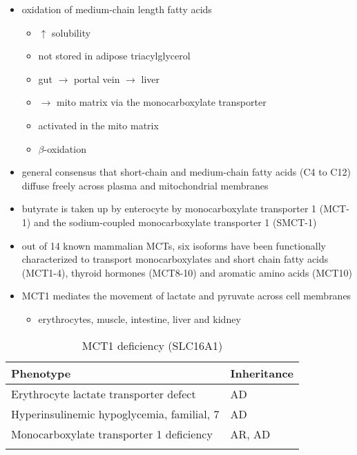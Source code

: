 \documentclass{scrartcl}
\begin{document}
\begin{itemize}
\item oxidation of medium-chain length fatty acids
\begin{itemize}
\item \(\uparrow\) solubility
\item not stored in adipose triacylglycerol
\item gut \(\to\) portal vein \(\to\) liver
\item \(\to\) mito matrix via the monocarboxylate transporter
\item activated in the mito matrix
\item \(\beta\)-oxidation
\end{itemize}

\item general consensus that short-chain and medium-chain fatty acids (C4
to C12) diffuse freely across plasma and mitochondrial membranes
\item butyrate is taken up by enterocyte by monocarboxylate transporter 1
(MCT-1) and the sodium-coupled monocarboxylate transporter 1
(SMCT-1)

\item out of 14 known mammalian MCTs, six isoforms have been functionally
characterized to transport monocarboxylates and short chain fatty
acids (MCT1-4), thyroid hormones (MCT8-10) and aromatic amino
acids (MCT10)

\item MCT1 mediates the movement of lactate and pyruvate across cell
membranes
\begin{itemize}
\item erythrocytes, muscle, intestine, liver and kidney
\end{itemize}
\end{itemize}

\begin{table}[htbp]
\caption[Monocarboxylate Transporter 1]{\label{tab:org284949a}
MCT1 deficiency (SLC16A1)}
\centering
\begin{tabular}{ll}
Phenotype & Inheritance\\
\hline
Erythrocyte lactate transporter defect & AD\\
Hyperinsulinemic hypoglycemia, familial, 7\footnotemark & AD\\
Monocarboxylate transporter 1 deficiency & AR, AD\\
 & \\
\end{tabular}
\end{table}
\end{document}
